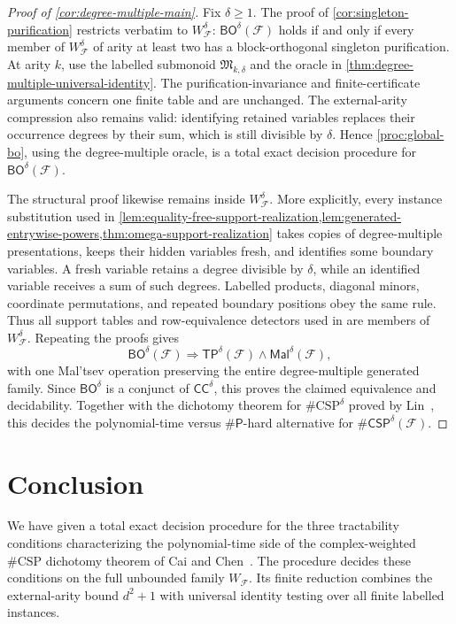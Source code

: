 \documentclass[11pt]{article}
\theoremstyle{plain}
\theoremstyle{definition}
\theoremstyle{remark}
\newcommand{\cF}{\mathcal F}
\newcommand{\CC}{\mathsf{CC}}
\newcommand{\BO}{\mathsf{BO}}
\newcommand{\TP}{\mathsf{TP}}
\newcommand{\Mal}{\mathsf{Mal}}
\newcommand{\CSPdeg}[2]{\mathsf{\#CSP}^{#1}(#2)}
\newcommand{\WFdeg}[1]{W_{\cF}^{#1}}
\begin{document}
\begin{proof}[Proof of \cref{cor:degree-multiple-main}]
Fix $\delta\ge1$.  The proof of \cref{cor:singleton-purification} restricts
verbatim to $\WFdeg{\delta}$: $\BO^\delta(\cF)$ holds if and only if every
member of $\WFdeg{\delta}$ of arity at least two has a block-orthogonal
singleton purification.  At arity $k$, use the labelled submonoid
$\mathfrak M_{k,\delta}$ and the oracle in
\cref{thm:degree-multiple-universal-identity}.  The purification-invariance
and finite-certificate arguments concern one finite table and are unchanged.
The external-arity compression also remains valid: identifying retained
variables replaces their occurrence degrees by their sum, which is still
divisible by $\delta$.  Hence \cref{proc:global-bo}, using the
degree-multiple oracle, is a total exact decision procedure for
$\BO^\delta(\cF)$.

The structural proof likewise remains inside $\WFdeg{\delta}$.  More
explicitly, every instance substitution used in
\cref{lem:equality-free-support-realization,lem:generated-entrywise-powers,thm:omega-support-realization}
takes copies of degree-multiple presentations, keeps their hidden variables
fresh, and identifies some boundary variables.  A fresh variable retains a
degree divisible by $\delta$, while an identified variable receives a sum
of such degrees.  Labelled products, diagonal minors, coordinate
permutations, and repeated boundary positions obey the same rule.  Thus all
support tables and row-equivalence detectors used in
 are members of
$\WFdeg{\delta}$.  Repeating the proofs gives
\[
  \BO^\delta(\cF)
  \Longrightarrow
  \TP^\delta(\cF)\wedge\Mal^\delta(\cF),
\]
with one Mal'tsev operation preserving the entire degree-multiple generated
family.  Since $\BO^\delta$ is a conjunct of $\CC^\delta$, this proves the
claimed equivalence and decidability.  Together with the dichotomy theorem
for $\#\mathrm{CSP}^{\delta}$ proved by Lin~\cite[Theorem~3]{Lin2021}, this
decides the polynomial-time versus $\#\mathsf P$-hard alternative for
$\CSPdeg{\delta}{\cF}$.
\end{proof}

\section{Conclusion}
\label{sec:conclusion}

We have given a total exact decision procedure for the three tractability
conditions characterizing the polynomial-time side of the complex-weighted
$\#\mathrm{CSP}$ dichotomy theorem of Cai and
Chen~\cite[Theorem~1 and Section~3.1]{CaiChen2017}.  The procedure decides
these conditions on the full unbounded family $W_{\cF}$.
Its finite reduction combines the external-arity bound $d^2+1$ with universal
identity testing over all finite labelled instances.
\end{document}
